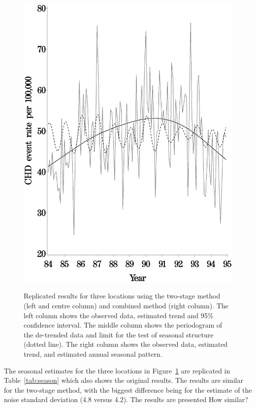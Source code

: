\begin{figure}[!h]
{    \includegraphics[scale=0.2]{figures/estimates_combined_warsaw.eps}
    }

\caption{Replicated results for three locations using the two-stage method (left and centre column) and combined method (right column). The left column shows the observed data, estimated trend and 95\% confidence interval. The middle column shows the periodogram of the de-trended data and limit for the test of seasonal structure (dotted line). The right column shows the observed data, estimated trend, and estimated annual seasonal pattern.}
	\label{fig}
\end{figure}

The seasonal estimates for the three locations in Figure~\ref{fig} are replicated in Table~\ref{tab:season} which also shows the original results. The results are similar for the two-stage method, with the biggest difference being for the estimate of the noise standard deviation (4.8 versus 4.2).
The results are presented
How similar?

